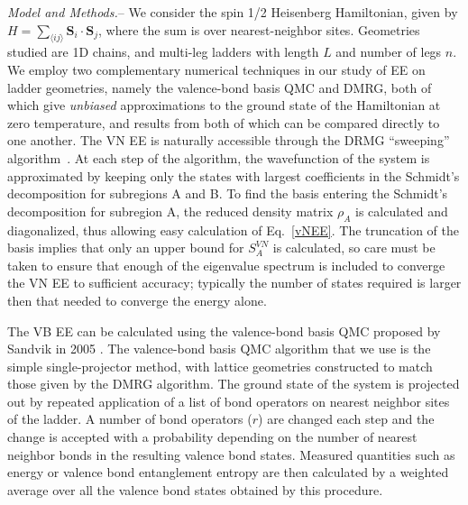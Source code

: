 \documentclass[prl,aps,twocolumn,floatfix,amsmath,amssymb,superscriptaddress,tightenlines]{revtex4}
\begin{document}
{\it Model and Methods.}-- We consider the spin 1/2 Heisenberg
Hamiltonian, given by  
$H =  \sum_{\langle i j \rangle}
{\mathbf S}_i \cdot {\mathbf S}_j \label{ham}$, 
where the sum
is over nearest-neighbor sites.  Geometries studied are 1D chains, and
multi-leg ladders with length $L$ and number of legs $n$.  
We employ two complementary numerical techniques in our study of EE on
ladder geometries, namely the valence-bond basis QMC and DMRG, both of
which give {\it unbiased} approximations to the ground state of the
Hamiltonian at zero temperature, and results from both of which can be
compared directly to one another.  The VN EE is naturally accessible
through the DRMG ``sweeping'' algorithm~\cite{White92, Scholl05}.  At each
step of the algorithm, the wavefunction of the system is approximated by
keeping only the states with largest coefficients in the Schmidt's
decomposition for subregions A and B. To find the basis entering the
Schmidt's decomposition for subregion A, the reduced density matrix
$\rho_A$ is calculated and diagonalized, thus allowing easy calculation
of Eq.~\ref{vNEE}. The truncation of the basis implies that only an upper
bound for $S^{VN}_{A}$ is calculated, so care must be taken to ensure
that enough of the eigenvalue spectrum is included to converge the VN EE
to sufficient accuracy; typically the number of states required is larger
then that needed to converge the energy alone.

The VB EE can be calculated using the valence-bond basis QMC proposed by
Sandvik in 2005 \cite{Sandvik}.  The valence-bond basis QMC algorithm that
we use is the simple single-projector method, with lattice geometries
constructed to match those given by the DMRG algorithm.  The ground state
of the system is projected out by repeated application of a list of bond
operators on nearest neighbor sites of the ladder.  A number of bond
operators ($r$) are changed each step and the change is accepted with a
probability depending on the number of nearest neighbor bonds in the
resulting valence bond states.  Measured quantities such as energy or
valence bond entanglement entropy are then calculated by a weighted
average over all the valence bond states obtained by this procedure.
\end{document}
